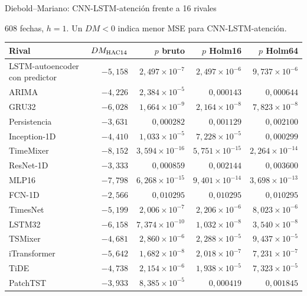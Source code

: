 \documentclass[aspectratio=169,10pt]{beamer}
\newcommand{\bajada}[1]{{\small #1\par}\smallskip}
\newcommand{\compacta}{\setlength{\abovedisplayskip}{3pt}\setlength{\belowdisplayskip}{3pt}\setlength{\abovedisplayshortskip}{2pt}\setlength{\belowdisplayshortskip}{3pt}}
\renewcommand{\arraystretch}{1.10}
\begin{document}
\begin{frame}[t]{Diebold--Mariano: CNN-LSTM-atención frente a 16 rivales}
\compacta
\bajada{608 fechas, $h=1$. Un $DM<0$ indica menor MSE para CNN-LSTM-atención.}
{\fontsize{7.6}{8.6}\selectfont\setlength{\tabcolsep}{4pt}\renewcommand{\arraystretch}{0.88}
\begin{tabularx}{\linewidth}{@{}Yrrrr@{}}
\toprule
\textbf{Rival} & \textbf{$DM_{\rm HAC14}$} & \textbf{$p$ bruto} & \textbf{$p$ Holm16} & \textbf{$p$ Holm64}\\\midrule
{}LSTM-autoencoder con predictor & $-5{,}158$ & $2{,}497\times10^{-7}$ & $2{,}497\times10^{-6}$ & $9{,}737\times10^{-6}$\\
ARIMA & $-4{,}226$ & $2{,}384\times10^{-5}$ & $0{,}000143$ & $0{,}000644$\\
GRU32 & $-6{,}028$ & $1{,}664\times10^{-9}$ & $2{,}164\times10^{-8}$ & $7{,}823\times10^{-8}$\\
Persistencia & $-3{,}631$ & $0{,}000282$ & $0{,}001129$ & $0{,}002100$\\
Inception-1D & $-4{,}410$ & $1{,}033\times10^{-5}$ & $7{,}228\times10^{-5}$ & $0{,}000299$\\
TimeMixer & $-8{,}152$ & $3{,}594\times10^{-16}$ & $5{,}751\times10^{-15}$ & $2{,}264\times10^{-14}$\\
ResNet-1D & $-3{,}333$ & $0{,}000859$ & $0{,}002144$ & $0{,}003600$\\
MLP16 & $-7{,}798$ & $6{,}268\times10^{-15}$ & $9{,}401\times10^{-14}$ & $3{,}698\times10^{-13}$\\
FCN-1D & $-2{,}566$ & $0{,}010295$ & $0{,}010295$ & $0{,}010295$\\
TimesNet & $-5{,}199$ & $2{,}006\times10^{-7}$ & $2{,}206\times10^{-6}$ & $8{,}023\times10^{-6}$\\
LSTM32 & $-6{,}158$ & $7{,}374\times10^{-10}$ & $1{,}032\times10^{-8}$ & $3{,}540\times10^{-8}$\\
TSMixer & $-4{,}681$ & $2{,}860\times10^{-6}$ & $2{,}288\times10^{-5}$ & $9{,}437\times10^{-5}$\\
iTransformer & $-5{,}642$ & $1{,}682\times10^{-8}$ & $2{,}018\times10^{-7}$ & $7{,}231\times10^{-7}$\\
TiDE & $-4{,}738$ & $2{,}154\times10^{-6}$ & $1{,}938\times10^{-5}$ & $7{,}323\times10^{-5}$\\
PatchTST & $-3{,}933$ & $8{,}385\times10^{-5}$ & $0{,}000419$ & $0{,}001845$\\

\end{tabularx}}
\end{frame}
\end{document}
